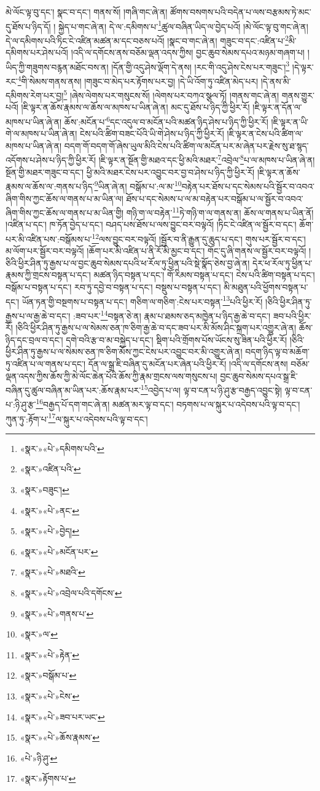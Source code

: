 མེ་ལོང་ལྟ་བུ་དང་། སྣང་བ་དང་། གནས་སོ། །གཞི་གང་ཞེ་ན། ཚོགས་བསགས་པའི་བདེན་པ་ལས་བརྩམས་ཏེ་མང་དུ་ཐོས་པ་ཉིད་དོ། །
སྐྱེད་པ་གང་ཞེ་ན། དེ་ལ་:དམིགས་པ་\footnote{«སྣར་»«པེ་»དམིགས་པའི་}ཚུལ་བཞིན་ཡིད་ལ་བྱེད་པའོ། །མེ་ལོང་ལྟ་བུ་གང་ཞེ་ན། དེ་ལ་དམིགས་པའི་ཏིང་ངེ་འཛིན་མཚན་མ་དང་བཅས་པའོ། །སྣང་བ་གང་ཞེ་ན། གཟུང་བ་དང་:འཛིན་པ་\footnote{«སྣར་»འཛིན་པའི་}མི་དམིགས་པར་ཤེས་པའོ། །འདི་ལ་དགོངས་ནས་བཅོམ་ལྡན་འདས་ཀྱིས། བྱང་ཆུབ་སེམས་དཔའ་མཉམ་གཞག་པ། །ཡིད་ཀྱི་གཟུགས་བརྙན་མཐོང་བས་ན། །དོན་གྱི་འདུ་ཤེས་ལྡོག་དེ་ནས། །རང་གི་འདུ་ཤེས་ངེས་པར་གཟུང་།\footnote{«སྣར་»བཟུང་།} །དེ་ལྟར་རང་\footnote{«སྣར་»«པེ་»ནང་}གི་སེམས་གནས་ནས། །གཟུང་བ་མེད་པར་རྟོགས་པར་བྱ། །དེ་ཡི་འོག་ཏུ་འཛིན་མེད་པར། །དེ་ནས་མི་དམིགས་རེག་པར་བྱ།\footnote{«སྣར་»«པེ་»བྱེད།} །ཞེས་ལེགས་པར་གསུངས་སོ། །ལེགས་པར་བཀའ་སྩལ་ཏོ། །གནས་གང་ཞེ་ན། གནས་གྱུར་པའོ། །ཇི་ལྟར་ན་ཆོས་རྣམས་ལ་ཆོས་ལ་མཁས་པ་ཡིན་ཞེ་ན། མང་དུ་ཐོས་པ་ཉིད་ཀྱི་ཕྱིར་རོ། །ཇི་ལྟར་ན་དོན་ལ་མཁས་པ་ཡིན་ཞེ་ན། ཆོས་:མངོན་པ་\footnote{«སྣར་»«པེ་»མངོན་པར་}དང་འདུལ་བ་མངོན་པའི་མཚན་ཉིད་ཤེས་པ་ཉིད་ཀྱི་ཕྱིར་རོ། །ཇི་ལྟར་ན་ཡི་གེ་ལ་མཁས་པ་ཡིན་ཞེ་ན། ངེས་པའི་ཚིག་བཟང་པོའི་ཡི་གེ་ཤེས་པ་ཉིད་ཀྱི་ཕྱིར་རོ། །ཇི་ལྟར་ན་ངེས་པའི་ཚིག་ལ་མཁས་པ་ཡིན་ཞེ་ན། བདག་གོ་བདག་གོ་ཞེས་ཡུལ་མིའི་ངེས་པའི་ཚིག་ལ་མངོན་པར་མ་ཞེན་པར་རྗེས་སུ་ཐ་སྙད་འདོགས་པ་ཤེས་པ་ཉིད་ཀྱི་ཕྱིར་རོ། །ཇི་ལྟར་ན་སྔོན་གྱི་མཐའ་དང་ཕྱི་མའི་མཐར་\footnote{«སྣར་»«པེ་»མཐའི་}འབྲེལ་\footnote{«སྣར་»«པེ་»འབྲེལ་པའི་དགོངས་}པ་ལ་མཁས་པ་ཡིན་ཞེ་ན། སྔོན་གྱི་མཐར་གཟུང་བ་དང་། ཕྱི་མའི་མཐར་ངེས་པར་འབྱུང་བར་བྱ་བ་ཤེས་པ་ཉིད་ཀྱི་ཕྱིར་རོ། །ཇི་ལྟར་ན་ཆོས་རྣམས་ལ་ཆོས་ལ་:གནས་པ་ཉིད་\footnote{«སྣར་»«པེ་»གནས་པ་}ཡིན་ཞེ་ན། བསྒོམ་པ་:ལ་མ་\footnote{«སྣར་»ལ་}བརྟེན་པར་ཐོས་པ་དང་སེམས་པའི་སྦྱོར་བ་འབའ་ཞིག་གིས་ཀྱང་ཆོས་ལ་གནས་པ་མ་ཡིན་ལ། ཐོས་པ་དང་སེམས་པ་ལ་མ་བརྟེན་པར་བསྒོམ་པ་ལ་སྦྱོར་བ་འབའ་ཞིག་གིས་ཀྱང་ཆོས་ལ་གནས་པ་མ་ཡིན་གྱི། གཉི་ག་ལ་བརྟེན་\footnote{«སྣར་»«པེ་»རྟེན་}ཏེ་གཉི་ག་ལ་གནས་ན། ཆོས་ལ་གནས་པ་ཡིན་ནོ། །འཛིན་པ་དང་། ཁ་ཏོན་བྱེད་པ་དང་། བཤད་པས་ཐོས་པ་ལས་བྱུང་བར་བལྟའོ། །ཏིང་ངེ་འཛིན་ལ་སྦྱོར་བ་དང་། ཆོག་པར་མི་འཛིན་པས་:བསྒོམས་པ་\footnote{«སྣར་»བསྒོམ་པ་}ལས་བྱུང་བར་བལྟའོ། །སྦྱོར་བ་ནི་རྒྱུན་དུ་ཆུད་པ་དང་། གུས་པར་སྦྱོར་བ་དང་། མ་ལོག་པར་སྦྱོར་བར་བལྟའོ། །ཆོག་པར་མི་འཛིན་པ་ནི་རོ་མི་མྱང་བ་དང་། གོང་དུ་ཞི་གནས་ལ་སྦྱོར་བར་བལྟའོ། །ཅིའི་ཕྱིར་ཤིན་ཏུ་རྒྱས་པ་ལ་བྱང་ཆུབ་སེམས་དཔའི་ཕ་རོལ་ཏུ་ཕྱིན་པའི་སྡེ་སྣོད་ཅེས་བྱ་ཞེ་ན། དེར་ཕ་རོལ་ཏུ་ཕྱིན་པ་རྣམས་ཀྱི་གྲངས་བསྟན་པ་དང་། མཚན་ཉིད་བསྟན་པ་དང་། གོ་རིམས་བསྟན་པ་དང་། ངེས་པའི་ཚིག་བསྟན་པ་དང་། བསྒོམ་པ་བསྟན་པ་དང་། རབ་ཏུ་དབྱེ་བ་བསྟན་པ་དང་། བསྡུས་པ་བསྟན་པ་དང་། མི་མཐུན་པའི་ཕྱོགས་བསྟན་པ་དང་། ཡོན་ཏན་གྱི་བསྔགས་པ་བསྟན་པ་དང་། གཅིག་ལ་གཅིག་:ངེས་པར་བསྟན་\footnote{«སྣར་»«པེ་»ངེས་}པའི་ཕྱིར་རོ། །ཅིའི་ཕྱིར་ཤིན་ཏུ་རྒྱས་པ་ལ་རྒྱ་ཆེ་བ་དང་། :ཟབ་པར་\footnote{«སྣར་»«པེ་»ཟབ་པར་ཡང་}བསྟན་ཅེ་ན། རྣམ་པ་ཐམས་ཅད་མཁྱེན་པ་ཉིད་རྒྱ་ཆེ་བ་དང་། ཟབ་པའི་ཕྱིར་རོ། །ཅིའི་ཕྱིར་ཤིན་ཏུ་རྒྱས་པ་ལ་སེམས་ཅན་ཁ་ཅིག་རྒྱ་ཆེ་བ་དང་ཟབ་པར་མི་མོས་ཤིང་སྐྲག་པར་འགྱུར་ཞེ་ན། ཆོས་ཉིད་དང་བྲལ་བ་དང་། དགེ་བའི་རྩ་བ་མ་བསྐྱེད་པ་དང་། སྡིག་པའི་གྲོགས་པོས་ཡོངས་སུ་ཟིན་པའི་ཕྱིར་རོ། །ཅིའི་ཕྱིར་ཤིན་ཏུ་རྒྱས་པ་ལ་སེམས་ཅན་ཁ་ཅིག་མོས་ཀྱང་ངེས་པར་འབྱུང་བར་མི་འགྱུར་ཞེ་ན། བདག་ཉིད་ལྟ་བ་མཆོག་ཏུ་འཛིན་པ་ལ་གནས་པ་དང་། དོན་ལ་སྒྲ་ཇི་བཞིན་དུ་མངོན་པར་ཞེན་པའི་ཕྱིར་རོ། །འདི་ལ་དགོངས་ནས། བཅོམ་ལྡན་འདས་ཀྱིས་ཆོས་ཀྱི་མེ་ལོང་ཆེན་པོའི་ཆོས་ཀྱི་རྣམ་གྲངས་ལས་གསུངས་པ། བྱང་ཆུབ་སེམས་དཔའ་སྒྲ་ཇི་བཞིན་དུ་ཚུལ་བཞིན་མ་ཡིན་པར་:ཆོས་རྣམ་པར་\footnote{«སྣར་»«པེ་»ཆོས་རྣམས་}འབྱེད་པ་ལ། ལྟ་བ་ངན་པ་ཉི་ཤུ་རྩ་བརྒྱད་འབྱུང་སྟེ། ལྟ་བ་ངན་པ་:ཉི་ཤུ་རྩ་\footnote{«པེ་»ཉི་ཤུ་}བརྒྱད་པོ་དག་གང་ཞེ་ན། མཚན་མར་ལྟ་བ་དང་། བཏགས་པ་ལ་སྐུར་པ་འདེབས་པའི་ལྟ་བ་དང་། ཀུན་ཏུ་:རྟོག་པ་\footnote{«སྣར་»རྟོགས་པ་}ལ་སྐུར་པ་འདེབས་པའི་ལྟ་བ་དང་། 